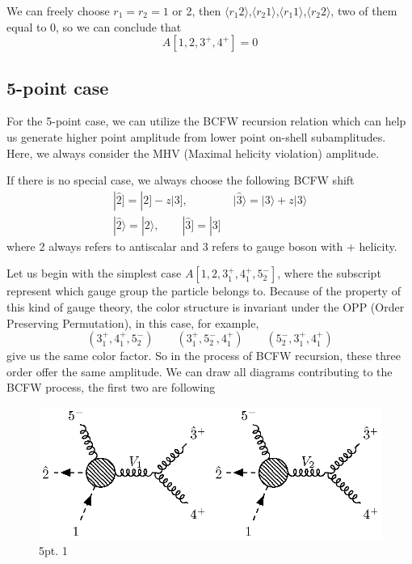 \documentclass[12pt]{article}
\newcommand{\avg}[1]{\langle #1 \rangle}
\newcommand{\aket}[1]{|#1\rangle}
\newcommand{\sket}[1]{|#1]}
\begin{document}
We can freely choose $r_1=r_2=1$ or 2, then $\avg{r_1 2}$,$\avg{r_2 1}$,$\avg{r_1 1}$,$\avg{r_2 2}$, two of them equal to 0, so we can conclude that
\begin{equation*}
    A[1,2,3^+,4^+]=0
\end{equation*}
\subsection{5-point case}
For the 5-point case, we can utilize the BCFW recursion relation which can help us generate higher point amplitude from lower point on-shell subamplitudes. Here, 
we always consider the MHV (Maximal helicity violation) amplitude. 
\par
If there is no special case, we always choose the following BCFW shift
\begin{gather*}
    \sket{\hat{2}}=\sket{2}-z\sket{3},\qquad \qquad \aket{\hat{3}}=\aket{3}+z\aket{3}\\
    \aket{\hat{2}}=\aket{2}, \qquad \sket{\hat{3}}=\sket{3}
\end{gather*}
where 2 always refers to antiscalar and 3 refers to gauge boson with + helicity.
\par
Let us begin with the simplest case $A[1,2,3_1^+,4_1^+,5_2^-]$, where the subscript represent which gauge group the particle belongs to. Because of the property 
of this kind of gauge theory, the color structure is invariant under the OPP (Order Preserving Permutation), in this case, for example,
\begin{equation*}
    (3_1^+,4_1^+,5_2^-)\qquad (3_1^+,5_2^-,4_1^+)\qquad(5_2^-,3_1^+,4_1^+)
\end{equation*}
give us the same color factor. So in the process of BCFW recursion, these three order offer the same amplitude. We can draw all diagrams contributing to the BCFW process, the first two are following
\par
\begin{figure}[H]
    \centering
    \includegraphics{5pt1.eps}
    \caption{5pt. 1}
    \label{2}
\end{figure}
\end{document}
